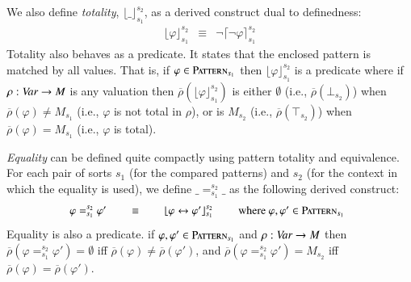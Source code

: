 \documentclass[UTF8,11pt]{article}
\theoremstyle{plain}
\theoremstyle{definition}
\theoremstyle{remark}
\newcommand{\Pattern}{\textsc{Pattern}\xspace}
\newcommand{\ra}{\rightarrow}
\newcommand{\lra}{\leftrightarrow}
\begin{document}
We also define \emph{totality}, $\lfloor\_\rfloor_{s_1}^{s_2}$, as a derived
construct dual to definedness:
$$
\begin{array}{lcl}
\lfloor\varphi\rfloor_{s_1}^{s_2}
& \equiv &
\neg\lceil\neg\varphi\rceil_{s_1}^{s_2}
\end{array}
$$
Totality also behaves as a predicate.
It states that the enclosed pattern is matched by all values.
That is, if $\varphi \in \Pattern_{s_1}$ then $\lfloor\varphi\rfloor_{s_1}^{s_2}$
is a predicate where if $\rho : \Var \ra M$ is any valuation
then $\overline{\rho}(\lfloor\varphi\rfloor_{s_1}^{s_2})$ is either $\emptyset$
(i.e., $\overline{\rho}(\bot_{s_2})$)
when $\overline{\rho}(\varphi) \neq M_{s_1}$
(i.e., $\varphi$ is not total in $\rho$), or is $M_{s_2}$
(i.e., $\overline{\rho}(\top_{s_2})$)
when $\overline{\rho}(\varphi) = M_{s_1}$
(i.e., $\varphi$ is total).

\emph{Equality} can be defined quite compactly using pattern totality and
equivalence.
For each pair of sorts $s_1$ (for the compared patterns) and
$s_2$ (for the context in which the equality is used), we define
$\_=_{s_1}^{s_2}\_$ as the following derived construct:
$$
\begin{array}{@{}rcll}
\varphi =_{s_1}^{s_2} \varphi' & \ \ \ \ \ \equiv \ \ \ \ \ &
\lfloor\varphi \lra \varphi'\rfloor_{s_1}^{s_2}
& \ \ \ \ \ \mbox{where } \varphi,\varphi' \in \Pattern_{s_1}
\end{array}
$$
Equality is also a predicate.
if $\varphi,\varphi' \in \Pattern_{s_1}$ and $\rho : \Var \ra M$ then
$\overline{\rho}(\varphi =_{s_1}^{s_2} \varphi') = \emptyset$
iff $\overline{\rho}(\varphi) \neq \overline{\rho}(\varphi')$, and
$\overline{\rho}(\varphi =_{s_1}^{s_2} \varphi') = M_{s_2}$
iff $\overline{\rho}(\varphi) = \overline{\rho}(\varphi')$.
\end{document}
